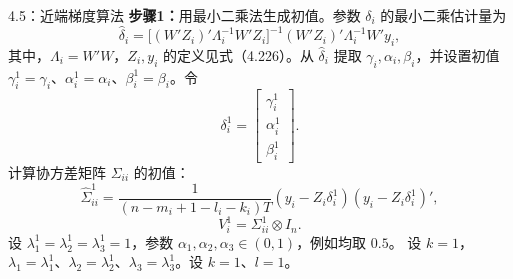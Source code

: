 \begin{bookalgorithm}{4.5：近端梯度算法}
\textbf{步骤1：}用最小二乘法生成初值。参数 $\delta_i$ 的最小二乘估计量为
\begin{equation}
\widehat\delta_i=
\bigl[(W'Z_i)'\Lambda_i^{-1}W'Z_i\bigr]^{-1}
(W'Z_i)'\Lambda_i^{-1}W'y_i,\tag{4.228}
\end{equation}
其中，$\Lambda_i=W'W$，$Z_i,y_i$ 的定义见式（4.226）。从 $\widehat\delta_i$ 提取 $\gamma_i,\alpha_i,\beta_i$，并设置初值
$\gamma_i^1=\gamma_i$、$\alpha_i^1=\alpha_i$、$\beta_i^1=\beta_i$。令
\[
\delta_i^1=\begin{bmatrix}\gamma_i^1\\\alpha_i^1\\\beta_i^1\end{bmatrix}.
\]
计算协方差矩阵 $\Sigma_{ii}$ 的初值：
\begin{equation}
\widehat\Sigma_{ii}^1=\frac{1}{(n-m_i+1-l_i-k_i)T}
(y_i-Z_i\delta_i^1)(y_i-Z_i\delta_i^1)',\tag{4.229}
\end{equation}
\[
V_i^1=\Sigma_{ii}^1\otimes I_n.
\]
设 $\lambda_1^1=\lambda_2^1=\lambda_3^1=1$，参数 $\alpha_1,\alpha_2,\alpha_3\in(0,1)$，例如均取 $0.5$。
设 $k=1$，$\lambda_1=\lambda_1^1$、$\lambda_2=\lambda_2^1$、$\lambda_3=\lambda_3^1$。设 $k=1$、$l=1$。


\end{bookalgorithm}
